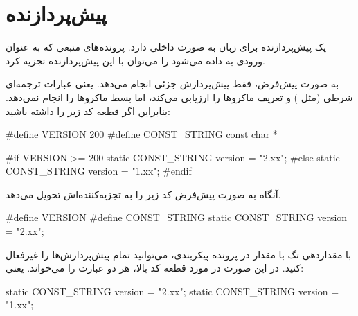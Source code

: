 \chapter{پیش‌پردازنده}

یک پیش‌پردازنده برای زبان  به صورت داخلی دارد. پرونده‌های منبعی که به
عنوان ورودی به  داده می‌شود را می‌توان با این پیش‌پردازنده تجزیه
کرد.

به صورت پیش‌فرض،  فقط پیش‌پردازش جزئی انجام می‌دهد. یعنی عبارات
ترجمه‌ای شرطی (مثل ) و تعریف ماکروها را ارزیابی می‌کند، اما بسط ماکروها
را انجام نمی‌دهد. بنابراین اگر قطعه کد زیر را داشته باشید:
\begin{C++}
#define VERSION 200
#define CONST_STRING const char *

#if VERSION >= 200
  static CONST_STRING version = "2.xx";
#else
  static CONST_STRING version = "1.xx";
#endif
\end{C++}

آنگاه  به صورت پیش‌فرض کد زیر را به تجزیه‌کننده‌اش تحویل می‌دهد.
\begin{C++}
#define VERSION
#define CONST_STRING
static CONST_STRING version = "2.xx";
\end{C++}

با مقداردهی تگ  با مقدار  در پرونده پیکربندی،
می‌توانید تمام پیش‌پردازش‌ها را غیرفعال کنید. در این صورت در مورد قطعه کد بالا،
 هر دو عبارت را می‌خواند. یعنی:
\begin{C++}
static CONST_STRING version = "2.xx";
static CONST_STRING version = "1.xx";
\end{C++}

